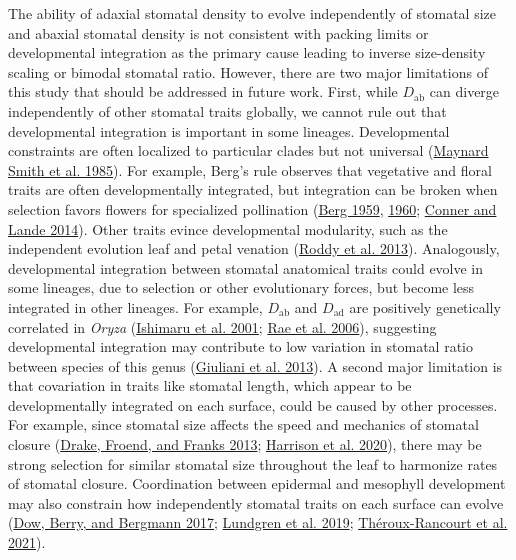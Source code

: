 \documentclass[
  12pt,
]{article}
\begin{document}
The ability of adaxial stomatal density to evolve independently of stomatal size and abaxial stomatal density is not consistent with packing limits or developmental integration as the primary cause leading to inverse size-density scaling or bimodal stomatal ratio. However, there are two major limitations of this study that should be addressed in future work. First, while \(D_\text{ab}\) can diverge independently of other stomatal traits globally, we cannot rule out that developmental integration is important in some lineages. Developmental constraints are often localized to particular clades but not universal (\protect\hyperlink{ref-maynard_smith_developmental_1985}{Maynard Smith et al. 1985}). For example, Berg's rule observes that vegetative and floral traits are often developmentally integrated, but integration can be broken when selection favors flowers for specialized pollination (\protect\hyperlink{ref-berg_general_1959}{Berg 1959}, \protect\hyperlink{ref-berg_ecological_1960}{1960}; \protect\hyperlink{ref-conner_raissa_2014}{Conner and Lande 2014}). Other traits evince developmental modularity, such as the independent evolution leaf and petal venation (\protect\hyperlink{ref-roddy_uncorrelated_2013}{Roddy et al. 2013}). Analogously, developmental integration between stomatal anatomical traits could evolve in some lineages, due to selection or other evolutionary forces, but become less integrated in other lineages. For example, \(D_\text{ab}\) and \(D_\text{ad}\) are positively genetically correlated in \emph{Oryza} (\protect\hyperlink{ref-ishimaru_identification_2001}{Ishimaru et al. 2001}; \protect\hyperlink{ref-rae_elucidating_2006}{Rae et al. 2006}), suggesting developmental integration may contribute to low variation in stomatal ratio between species of this genus (\protect\hyperlink{ref-giuliani_coordination_2013}{Giuliani et al. 2013}). A second major limitation is that covariation in traits like stomatal length, which appear to be developmentally integrated on each surface, could be caused by other processes. For example, since stomatal size affects the speed and mechanics of stomatal closure (\protect\hyperlink{ref-drake_smaller_2013}{Drake, Froend, and Franks 2013}; \protect\hyperlink{ref-harrison_influence_2020}{Harrison et al. 2020}), there may be strong selection for similar stomatal size throughout the leaf to harmonize rates of stomatal closure. Coordination between epidermal and mesophyll development may also constrain how independently stomatal traits on each surface can evolve (\protect\hyperlink{ref-dow_disruption_2017}{Dow, Berry, and Bergmann 2017}; \protect\hyperlink{ref-lundgren_mesophyll_2019}{Lundgren et al. 2019}; \protect\hyperlink{ref-theroux-rancourt_maximum_2021}{Théroux-Rancourt et al. 2021}).
\end{document}
